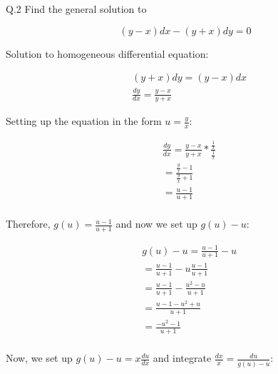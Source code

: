 \documentclass{article}
\begin{document}
    \newpage
    \begin{singlespace}
        \begin{flushleft}
            Q.2 Find the general solution to
        \end{flushleft}
        \begin{center}
            \begin{equation}
                \left( y-x \right)dx - \left( y +x \right)dy = 0
            \end{equation}
        \end{center}
        \begin{flushleft}
            Solution to homogeneous differential equation:
        \end{flushleft}
        \begin{align*}
            &\left( y +x \right)dy = \left( y-x \right)dx  \\
            &\frac{dy}{dx} = \frac{y-x}{y+x}
        \end{align*}
        \begin{flushleft}
            Setting up the equation in the form $u=\frac{y}{x}$:
        \end{flushleft}
        \begin{align*}
            &\frac{dy}{dx} = \frac{y-x}{y+x} * \frac{\frac{1}{x}}{\frac{1}{x}} \\
            &= \frac{\frac{y}{x}-1}{\frac{y}{x}+1} \\
            &= \frac{u-1}{u+1} \\
        \end{align*}
        \begin{flushleft}
            Therefore, $g(u)=\frac{u-1}{u+1}$ and now we set up $g(u)-u$:
        \end{flushleft}
        \begin{align*}
            &g(u)-u = \frac{u-1}{u+1} - u \\
            &= \frac{u-1}{u+1} - u\frac{u-1}{u+1} \\
            &= \frac{u-1}{u+1} - \frac{u^{2}-u}{u+1} \\
            &= \frac{u-1-u^{2}+u}{u+1} \\
            &= \frac{-u^{2}-1}{u+1} \\
        \end{align*}
        \begin{flushleft}
            Now, we set up $g(u)-u=x\frac{du}{dx}$ and integrate $\frac{dx}{x}=\frac{du}{g(u)-u}$:
        \end{flushleft}

\end{singlespace}
\end{document}
